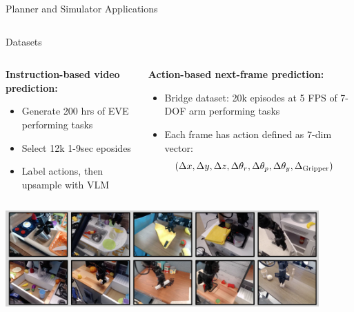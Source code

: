 \documentclass{beamer}
\begin{document}
\begin{frame}{Planner and Simulator Applications}
\begin{columns}[t]
\begin{column}{.5\textwidth}
\begin{center}
            \end{center}
		\end{column}
	\end{columns}

\end{frame}

\begin{frame}{Datasets}
    \vspace{-1em}
	\begin{columns}[t]
		\begin{column}{.5\textwidth}
            \small
            \textbf{Instruction-based video prediction:}
            \begin{itemize}[label=-]
                \item Generate 200 hrs of EVE performing tasks
                \item Select 12k 1-9sec eposides
                \item Label actions, then upsample with VLM
            \end{itemize}
		\end{column}
		\begin{column}{.5\textwidth}
            \small
            \textbf{Action-based next-frame prediction:}
            \begin{itemize}[label=-]
                \item Bridge dataset: 20k episodes at 5 FPS of 7-DOF arm performing tasks
                \item Each frame has action defined as 7-dim vector: \[\hspace{-1em}(\Delta x, \Delta y, \Delta z, \Delta \theta_r, \Delta \theta_p, \Delta \theta_y, \Delta_{\text{Gripper}})\]
            \end{itemize}
		\end{column}
	\end{columns}
    \begin{center}
        \includegraphics[width=0.9\textwidth]{./img/post_ds.png}
    \end{center}
\end{frame}
\end{document}

